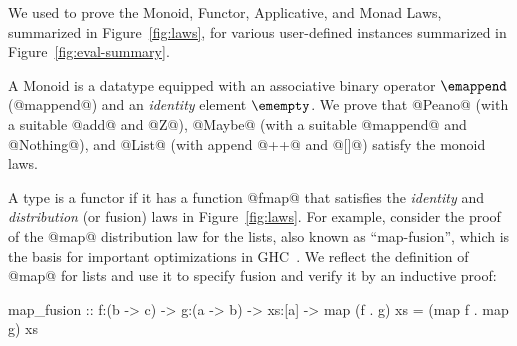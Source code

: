 We used \toolname to prove the Monoid, Functor,
Applicative, and Monad Laws, summarized in
Figure~\ref{fig:laws}, for various user-defined
instances summarized in Figure~\ref{fig:eval-summary}.


%
A Monoid is a datatype equipped with an associative
binary operator $\emappend$ (@mappend@) and an \emph{identity}
element $\emempty$.
%
We prove that
%
@Peano@ (with a suitable @add@ and @Z@),
@Maybe@ (with a suitable @mappend@ and @Nothing@), and
@List@ (with append @++@ and @[]@) satisfy the monoid laws.
%

%
A type is a functor if it has a function
@fmap@ that satisfies the \emph{identity}
and \emph{distribution} (or fusion) laws
in Figure~\ref{fig:laws}.
%
For example, consider the proof of
the @map@ distribution law for the lists,
also known as ``map-fusion'', which is the
basis for important optimizations in
GHC~\cite{ghc-map-fusion}.
%
We reflect the definition of @map@ for lists
%
%
and use it to specify fusion and verify it by an inductive proof:
%
\begin{mcode}
  map_fusion :: f:(b -> c) -> g:(a -> b) -> xs:[a] -> {map (f . g) xs = (map f . map g) xs}
\end{mcode}

